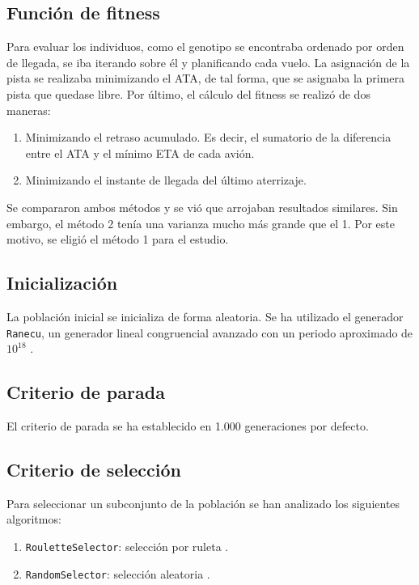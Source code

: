 \documentclass[a4paper,12pt,titlepage]{article}
\begin{document}
\subsection{Función de fitness}

Para evaluar los individuos, como el genotipo se encontraba ordenado por orden de llegada, se iba iterando sobre él y planificando cada vuelo. La asignación de la pista se realizaba minimizando el ATA, de tal forma, que se asignaba la primera pista que quedase libre. Por último, el cálculo del fitness se realizó de dos maneras:

\begin{enumerate}[noitemsep]
	\item Minimizando el retraso acumulado. Es decir, el sumatorio de la diferencia entre el ATA y el mínimo ETA de cada avión.
	\item Minimizando el instante de llegada del último aterrizaje.
\end{enumerate}

Se compararon ambos métodos y se vió que arrojaban resultados similares. Sin embargo, el método 2 tenía una varianza mucho más grande que el 1. Por este motivo, se eligió el método 1 para el estudio.

\subsection{Inicialización}

La población inicial se inicializa de forma aleatoria. Se ha utilizado el generador \lstinline|Ranecu|, un generador lineal congruencial avanzado con un periodo aproximado de $10^{18}$ \citep{jclec:ranecu}.

\subsection{Criterio de parada}

El criterio de parada se ha establecido en 1.000 generaciones por defecto.

\subsection{Criterio de selección}

Para seleccionar un subconjunto de la población se han analizado los siguientes algoritmos:

\begin{enumerate}[noitemsep]
	\item \lstinline|RouletteSelector|: selección por ruleta \citep{jclec:roulette}.
	\item \lstinline|RandomSelector|: selección aleatoria \citep{jclec:random}.
\end{enumerate}
\end{document}
